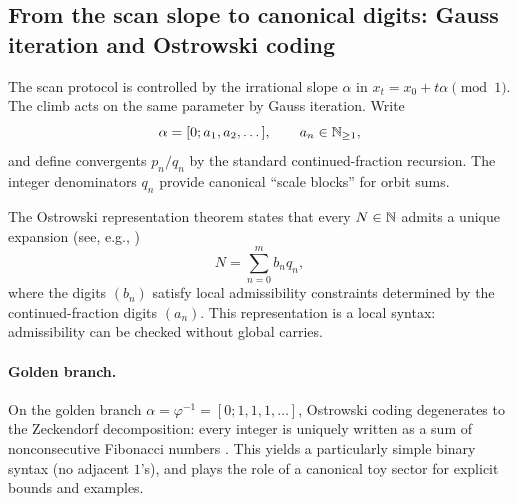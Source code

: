 \subsection{From the scan slope to canonical digits: Gauss iteration and Ostrowski coding}
\label{sec:alpha_to_digits_ostrowski}

The scan protocol is controlled by the irrational slope $\alpha$ in $x_t=x_0+t\alpha\pmod 1$. The climb acts on the same parameter by Gauss iteration. Write
\begin{equation}
\alpha=[0;a_1,a_2,\dots],\qquad a_n\in\mathbb{N}_{\ge 1},
\end{equation}
and define convergents $p_n/q_n$ by the standard continued-fraction recursion. The integer denominators $q_n$ provide canonical ``scale blocks'' for orbit sums.

The Ostrowski representation theorem states that every $N\in\mathbb{N}$ admits a unique expansion (see, e.g., \cite{IosifescuKraaikamp2002})
\begin{equation}
\label{eq:ostrowski_rep}
N=\sum_{n=0}^{m} b_n q_n,
\end{equation}
where the digits $(b_n)$ satisfy local admissibility constraints determined by the continued-fraction digits $(a_n)$. This representation is a local syntax: admissibility can be checked without global carries.

\paragraph{Golden branch.}
On the golden branch $\alpha=\varphi^{-1}=[0;1,1,1,\dots]$, Ostrowski coding degenerates to the Zeckendorf decomposition: every integer is uniquely written as a sum of nonconsecutive Fibonacci numbers \cite{Zeckendorf1972}. This yields a particularly simple binary syntax (no adjacent $1$'s), and plays the role of a canonical toy sector for explicit bounds and examples.


